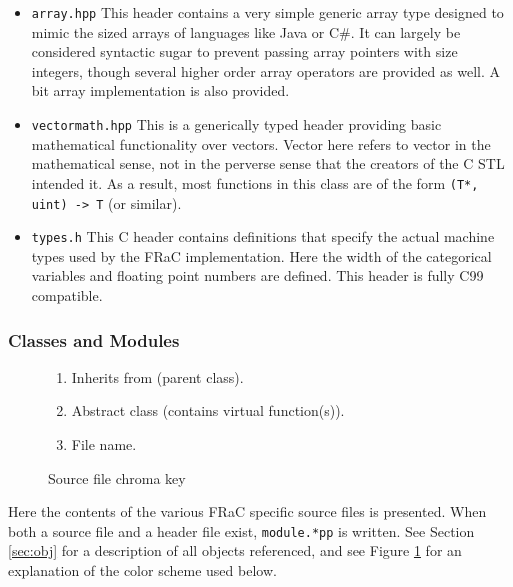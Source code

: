 \documentclass{article}
\newcommand{\CC}{C\nolinebreak\hspace{-.05em}\raisebox{.4ex}{\tiny\bf +}\nolinebreak\hspace{-.10em}\raisebox{.4ex}{\tiny\bf +}}
\newcommand{\filename}[1]{\texttt{\color{filename}#1}}
\begin{document}
\begin{multicols}{2}
\begin{itemize}

\item \texttt{array.hpp} This header contains a very simple generic array type designed to mimic the sized arrays of languages like Java or C\#.  It can largely be considered syntactic sugar to prevent passing array pointers with size integers, though several higher order array operators are provided as well.  A bit array implementation is also provided.

\item \texttt{vectormath.hpp} This is a generically typed header providing basic mathematical functionality over vectors.  Vector here refers to vector in the mathematical sense, not in the perverse sense that the creators of the \CC{} STL intended it.  As a result, most functions in this class are of the form \texttt{(T*, uint) -> T} (or similar).

\item \texttt{types.h} This C header contains definitions that specify the actual machine types used by the FRa\CC{} implementation.  Here the width of the categorical variables and floating point numbers are defined.  This header is fully C99 compatible.

\end{itemize}

\subsubsection{Classes and Modules}

\label{sec:arch:code}


\begin{figure}

\begin{multicols}{3}
\begin{enumerate}
\item \textcolor{superclass}{Inherits from} (parent class).
\item \textcolor{abstract}{Abstract class} (contains virtual function(s)).
\item \textcolor{filename}{File name}.
\end{enumerate}
\end{multicols}

\caption{Source file chroma key}
\label{fig:sfck}
\end{figure}

Here the contents of the various FRaC specific source files is presented.  When both a source file and a header file exist, \filename{module.*pp} is written.  See Section \ref{sec:obj} for a description of all objects referenced, and see Figure \ref{fig:sfck} for an explanation of the color scheme used below.


\end{multicols}
\end{document}
